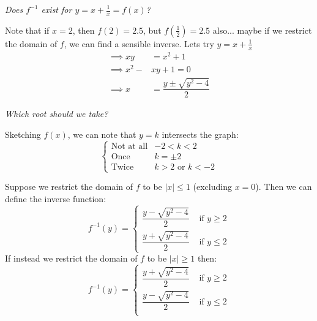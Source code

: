 \documentclass[10pt]{scrartcl}
\begin{document}
\begin{example} \emph{Does $f^{-1}$ exist for $y = x + \frac{1}{x} = f(x)$?}

Note that if $x = 2$, then $f(2) = 2.5$, but $f(\frac{1}{2}) = 2.5$ also...
maybe if we restrict the domain of $f$, we can find a sensible inverse. Lets try $y = x + \frac{1}{x}$
\[
\begin{aligned}
  \implies xy &= x^2 + 1\\
  \implies x^2 -& xy + 1 = 0\\
  \implies x &= \dfrac{y \pm \sqrt{y^2 -4}}{2}
\end{aligned}
\]


\emph{Which root should we take?}

Sketching $f(x)$, we can note that $y = k$ intersects the graph: 
\[\begin{cases}
\text{Not at all}& -2 < k< 2\\
\text{Once} & k = \pm 2\\
\text{Twice} & k>2 \text{ or } k<-2
\end{cases}\]



\begin{center}
\end{center}



\vspace{5pt}

Suppose we restrict the domain of $f$ to be $|x| \leq 1$ (excluding $x=0$). Then we can define the inverse function:
\[f^{-1}(y) = 
\begin{cases}
 \dfrac{y - \sqrt{y^2 -4}}{2} & \text{ if } y \geq 2 \\[0.3cm]
 \dfrac{y + \sqrt{y^2 -4}}{2} & \text{ if } y \leq 2 
 \end{cases}
 \]
If instead we restrict the domain of $f$ to be $|x| \geq 1$ then:
\[f^{-1}(y) = \begin{cases}
 \dfrac{y + \sqrt{y^2 -4}}{2} & \text{ if } y \geq 2 \\[0.3cm]
 \dfrac{y - \sqrt{y^2 -4}}{2} & \text{ if } y \leq 2 \\
 \end{cases}
 \]
\end{example}
\end{document}
